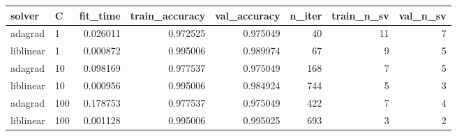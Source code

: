 \begin{tabular}{llrrrrrr}
\toprule
   solver &   C &  fit\_time &  train\_accuracy &  val\_accuracy &  n\_iter &  train\_n\_sv &  val\_n\_sv \\
\midrule
  adagrad &   1 &  0.026011 &        0.972525 &      0.975049 &      40 &          11 &         7 \\
liblinear &   1 &  0.000872 &        0.995006 &      0.989974 &      67 &           9 &         5 \\
  adagrad &  10 &  0.098169 &        0.977537 &      0.975049 &     168 &           7 &         5 \\
liblinear &  10 &  0.000956 &        0.995006 &      0.984924 &     744 &           5 &         3 \\
  adagrad & 100 &  0.178753 &        0.977537 &      0.975049 &     422 &           7 &         4 \\
liblinear & 100 &  0.001128 &        0.995006 &      0.995025 &     693 &           3 &         2 \\
\bottomrule
\end{tabular}
